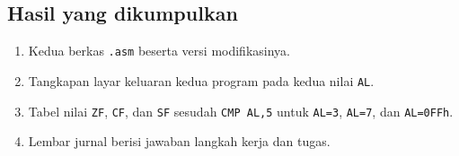 \subsection{Hasil yang dikumpulkan}

\begin{enumerate}
    \item Kedua berkas \texttt{.asm} beserta versi modifikasinya.
    \item Tangkapan layar keluaran kedua program pada kedua nilai
          \texttt{AL}.
    \item Tabel nilai \texttt{ZF}, \texttt{CF}, dan \texttt{SF}
          sesudah \texttt{CMP AL,5} untuk \texttt{AL=3},
          \texttt{AL=7}, dan \texttt{AL=0FFh}.
    \item Lembar jurnal berisi jawaban langkah kerja dan tugas.
\end{enumerate}
